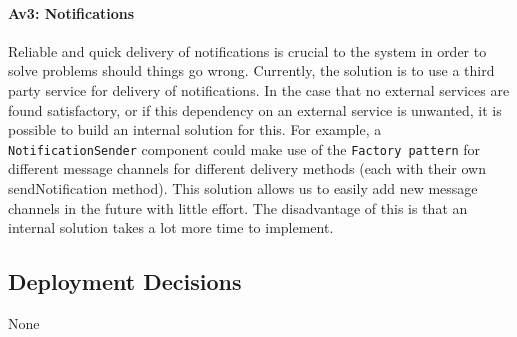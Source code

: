         \paragraph{Av3: Notifications}
            Reliable and quick delivery of notifications is crucial to the
            system in order to solve problems should things go wrong. Currently,
            the solution is to use a third party service for delivery of
            notifications. In the case that no external services are found
            satisfactory, or if this dependency on an external service is
            unwanted, it is possible to build an internal solution for this.
            For example, a \texttt{NotificationSender} component could make use
            of the \texttt{Factory pattern} for different message channels for
            different delivery methods (each with their own sendNotification method).
            This solution allows us to easily add new message channels in the
            future with little effort. The disadvantage of this is that an
            internal solution takes a lot more time to implement.


    \subsection*{Deployment Decisions}
        None
